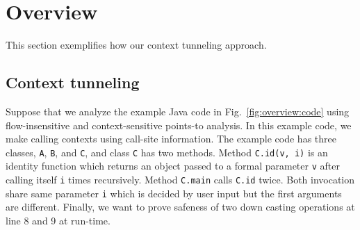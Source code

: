 
\section{Overview}
\label{sec:overview}
This section exemplifies how our context tunneling approach.
\subsection{Context tunneling}
Suppose that we analyze the example Java code in Fig.~\ref{fig:overview:code} using flow-insensitive and context-sensitive points-to analysis. In this example code, we make calling contexts using call-site information. The example code has three classes, \texttt{A}, \texttt{B}, and \texttt{C}, and class \texttt{C} has two methods. Method \texttt{C.id(v, i)} is an identity function which returns an object passed to a formal parameter \texttt{v} after calling itself \texttt{i} times recursively. Method \texttt{C.main} calls \texttt{C.id} twice. Both invocation share same parameter \texttt{i} which is decided by user input but the first arguments are different. Finally, we want to prove safeness of two down casting operations at line 8 and 9 at run-time.

